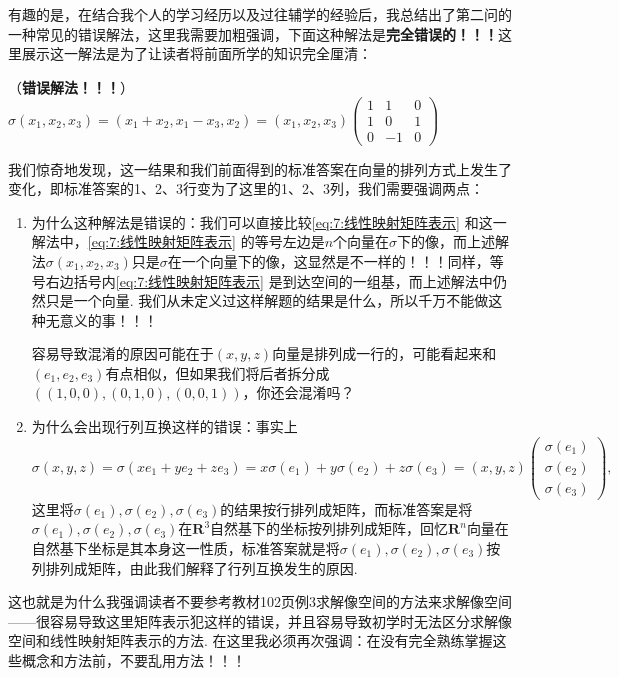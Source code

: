 有趣的是，在结合我个人的学习经历以及过往辅学的经验后，我总结出了第二问的一种常见的错误解法，这里我需要加粗强调，下面这种解法是\textbf{完全错误的！！！}这里展示这一解法是为了让读者将前面所学的知识完全厘清：

\begin{solution}
    （\textbf{\songti 错误解法！！！}）$\sigma(x_1,x_2,x_3)=(x_1+x_2,x_1-x_3, x_2)=(x_1,x_2,x_3)\begin{pmatrix}
            1 & 1  & 0 \\
            1 & 0  & 1 \\
            0 & -1 & 0
        \end{pmatrix}$
\end{solution}

我们惊奇地发现，这一结果和我们前面得到的标准答案在向量的排列方式上发生了变化，即标准答案的1、2、3行变为了这里的1、2、3列，我们需要强调两点：
\begin{enumerate}
    \item 为什么这种解法是错误的：我们可以直接比较\autoref{eq:7:线性映射矩阵表示} 和这一解法中，\autoref*{eq:7:线性映射矩阵表示} 的等号左边是$n$个向量在$\sigma$下的像，而上述解法$\sigma(x_1,x_2,x_3)$只是$\sigma$在一个向量下的像，这显然是不一样的！！！同样，等号右边括号内\autoref*{eq:7:线性映射矩阵表示} 是到达空间的一组基，而上述解法中仍然只是一个向量. 我们从未定义过这样解题的结果是什么，所以千万不能做这种无意义的事！！！

          容易导致混淆的原因可能在于$(x,y,z)$向量是排列成一行的，可能看起来和$(e_1,e_2,e_3)$有点相似，但如果我们将后者拆分成$((1,0,0),(0,1,0),(0,0,1))$，你还会混淆吗？

    \item 为什么会出现行列互换这样的错误：事实上
          \[\sigma(x,y,z)=\sigma(xe_1+ye_2+ze_3)=x\sigma(e_1)+y\sigma(e_2)+z\sigma(e_3)=(x,y,z)\begin{pmatrix}
                  \sigma(e_1) \\ \sigma(e_2) \\ \sigma(e_3)
              \end{pmatrix},\]
          这里将$\sigma(e_1),\sigma(e_2),\sigma(e_3)$的结果按行排列成矩阵，而标准答案是将$\sigma(e_1),\sigma(e_2),\sigma(e_3)$在$\mathbf{R}^3$自然基下的坐标按列排列成矩阵，回忆$\mathbf{R}^n$向量在自然基下坐标是其本身这一性质，标准答案就是将$\sigma(e_1),\sigma(e_2),\sigma(e_3)$按列排列成矩阵，由此我们解释了行列互换发生的原因.
\end{enumerate}

这也就是为什么我强调读者不要参考教材102页例3求解像空间的方法来求解像空间——很容易导致这里矩阵表示犯这样的错误，并且容易导致初学时无法区分求解像空间和线性映射矩阵表示的方法. 在这里我必须再次强调：在没有完全熟练掌握这些概念和方法前，不要乱用方法！！！

